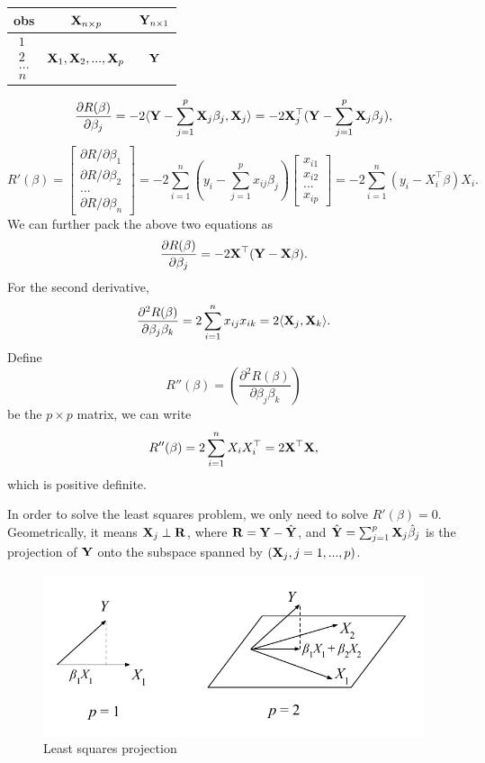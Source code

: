 \documentclass{article}\usepackage[]{graphicx}\usepackage[]{color}
\def\T{{\top}}
\def\X{{\bf X}}
\def\Y{{\bf Y}}
\def\R{{\bf R}}
\begin{document}
\begin{table}[h]
\centering
\begin{tabular}{|c|c|c|}
\hline
 obs & $\X_{n\times p}$ & $\Y_{n\times 1}$ \\
\hline\hline
$\begin{matrix} 1\\ 2\\...\\ n \end{matrix}$  & $\X_1, \X_2, ..., \X_p$         & $\Y$ \\
\hline
\end{tabular}
\end{table}

    \[
     \frac{\partial R(\beta)}{\partial \beta_j}  = -2 \langle \Y - \sum_{j=1}^{p} \X_j \beta_j, \X_j\rangle = -2 \X_j^\T ( \Y - \sum_{j=1}^{p} \X_j \beta_j), 
  \]
  \[
     R'(\beta) = \begin{bmatrix} \partial R/\partial \beta_1\\ \partial R/\partial \beta_2 \\ ...\\ \partial R/\partial \beta_n \end{bmatrix} = 
      -2 \sum_{i=1}^{n} \left(y_i - \sum_{j=1}^{p} x_{ij} \beta_j\right)  \begin{bmatrix} x_{i1}\\ x_{i2}\\ ... \\x_{ip} \end{bmatrix} 
      = - 2\sum_{i=1}^{n} (y_i - X_i^\T\beta) X_i. 
     \]
We can further pack the above two equations as 
    \[
     \frac{\partial R(\beta)}{\partial \beta_j}  = -2  \X^\T ( \Y - \X\beta). 
  \]
For the second derivative, 
   \[
     \frac{\partial^2 R(\beta)}{\partial \beta_j \beta_k}  = 2 \sum_{i=1}^{n} x_{ij} x_{ik} = 2 \langle \X_j, \X_k\rangle. 
  \]
  Define 
  \[
  R''(\beta) = \left(      \frac{\partial^2 R(\beta)}{\partial \beta_j \beta_k}  \right) 
  \]
  be the $p\times p$ matrix, we can write 
 \[
    R''(\beta) = 2\sum_{i=1}^{n} X_i X_i^\T =  2 \X^\T \X, 
    \]
    which is positive definite. 
    
In order to solve the least squares problem, we only need to solve $R'(\beta) = 0$. Geometrically, it means $\X_j \perp \R$, where $\R  = \Y -\hat{\Y}$, and  $\hat{\Y} =  \sum_{j=1}^{p} \X_j \hat{\beta}_j$ is the projection of $\Y$ onto the subspace spanned by $(\X_j, j = 1, ..., p)$. 

\begin{figure}[h]
\centering
\includegraphics[width=0.5\linewidth]{figures/least-squares.pdf}
\caption{Least squares projection}
\end{figure}
\end{document}
